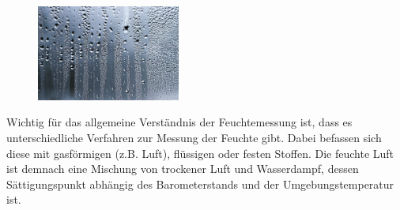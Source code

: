 \begin{center}
\begin{minipage}[h]{0.9\linewidth}
\begin{figure}
\includegraphics[width=0.42\textwidth]{graphics/luftfeuchtigkeit.jpg}
\\
\end{figure}
	
\vspace{3pt}

Wichtig für das allgemeine Verständnis der Feuchtemessung ist, dass es unterschiedliche Verfahren zur Messung der Feuchte gibt. Dabei befassen sich diese mit gasförmigen (z.B. Luft), flüssigen oder festen Stoffen. Die feuchte Luft ist demnach eine Mischung von trockener Luft und Wasserdampf, dessen Sättigungspunkt abhängig des Barometerstands und der Umgebungstemperatur ist.

\end{minipage}
\end{center}